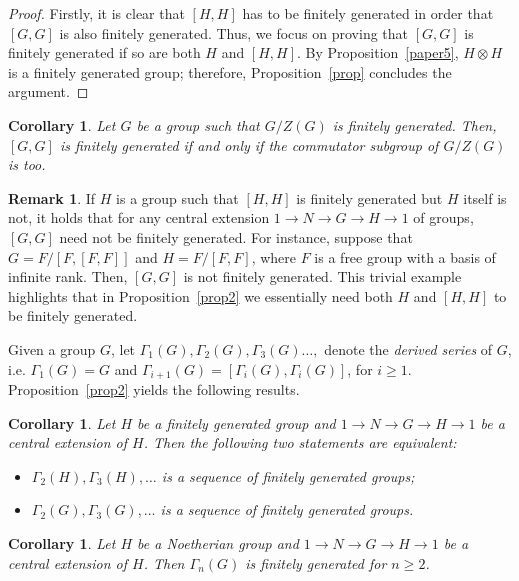 \documentclass[12pt,reqno]{amsart}
\newtheorem{corollary}[subsection]{Corollary}
\theoremstyle{definition}
\newtheorem{remark}[subsection]{Remark}
\numberwithin{equation}{section}
\theoremstyle{definition}
\begin{document}
\begin{proof}
Firstly, it is clear that $[H, H]$ has to be finitely generated in order that $[G, G]$ is also finitely generated.
 Thus, we focus on proving that $[G, G]$ is finitely generated if so are both $H$ and $[H, H]$.
By  Proposition~\ref{paper5}, $H\otimes H$ is a finitely generated group; therefore, Proposition~\ref{prop} concludes the argument.
\end{proof}

\begin{corollary}
Let $G$ be a group such that $G/Z(G)$ is finitely generated. Then, $[G, G]$ is finitely generated if and only if the commutator subgroup of $G/Z(G)$ is too.
\end{corollary}

\begin{remark}
If $H$ is a group such that $[H, H]$ is finitely generated but $H$ itself is not, it holds that for any central extension
$1\to N \to G \to H \to 1$ of groups, $[G, G]$ need not be finitely generated. For instance, suppose that $G=F/[F, [F, F]]$ and $H=F/[F, F]$, where
$F$ is a free group with a basis of infinite rank. Then, $[G, G]$ is not finitely generated. This trivial example highlights that in Proposition~\ref{prop2}
we essentially need both $H$ and $[H, H]$ to be finitely generated.
\end{remark}

Given a group $G$, let $\Gamma_1(G), \Gamma_2(G), \Gamma_3(G) \dots,$ denote the \emph{derived series} of $G$, i.e.
$\Gamma_1(G)=G$ and $\Gamma_{i+1}(G)=[\Gamma_i(G), \Gamma_i(G)]$, for $i\geq 1$. Proposition~\ref{prop2} yields the following results.

\begin{corollary}
Let $H$ be a finitely generated group and $1\to N \to G \to H \to 1$ be a central extension of $H$. Then the following two statements are equivalent:
\begin{itemize}
  \item[(i)] $\Gamma_2(H), \Gamma_3(H), \dots$ is a sequence of finitely generated groups;
  \item[(ii)] $\Gamma_2(G), \Gamma_3(G), \dots$ is a sequence of finitely generated groups.
\end{itemize}
\end{corollary}

\begin{corollary}
Let $H$ be a Noetherian group and $1\to N \to G \to H \to 1$ be a central extension of $H$. Then $\Gamma_n(G)$ is finitely generated for $n\geq 2$.
\end{corollary}
\end{document}
